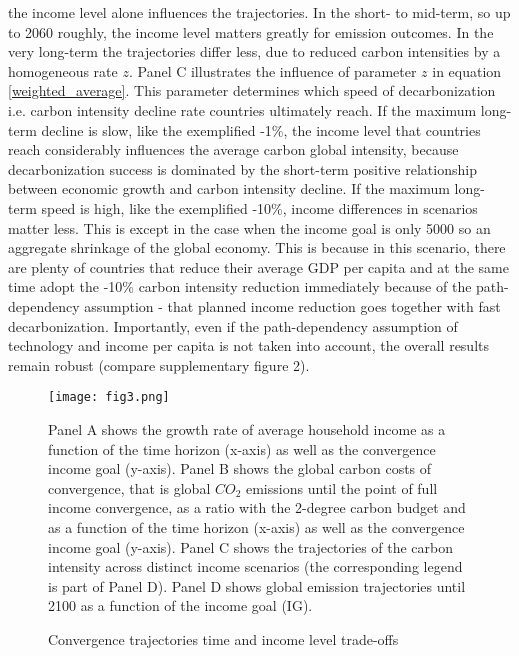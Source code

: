 \documentclass{article}
\begin{document}
the income level alone influences the trajectories. In the short- to mid-term, so up to 2060 roughly, the income level matters greatly for emission outcomes. In the very long-term the trajectories differ less, due to reduced carbon intensities by a homogeneous rate \(z\). %
Panel C illustrates the influence of parameter \(z\) in equation \ref{weighted_average}. This parameter determines which speed of decarbonization i.e. carbon intensity decline rate countries ultimately reach. If the maximum long-term decline is slow, like the exemplified -1\%, the income level that countries reach considerably influences the average carbon global intensity, because decarbonization success is dominated by the short-term positive relationship between economic growth and carbon intensity decline. If the maximum long-term speed is high, like the exemplified -10\%, income differences in scenarios matter less. This is except in the case when the income goal is only 5000 so an aggregate shrinkage of the global economy. This is because in this scenario, there are plenty of countries that reduce their average GDP per capita and at the same time adopt the -10\% carbon intensity reduction immediately because of the path-dependency assumption - that planned income reduction goes together with fast decarbonization. Importantly, even if the path-dependency assumption of technology and income per capita is not taken into account, the overall results remain robust (compare supplementary figure 2). 


\begin{figure}[hbt!]
\centering
 \texttt{[image: fig3.png]}
  \caption{Convergence trajectories time and income level trade-offs}
  \label{Figure 3: Carbon budget use until achieved convergence}
  \medskip
\small Panel A shows the growth rate of average household income as a function of the time horizon (x-axis) as well as the convergence income goal (y-axis). Panel B shows the global carbon costs of convergence, that is global \(CO_2\) emissions until the point of full income 
convergence, as a ratio with the 2-degree carbon budget and as a function of the time horizon (x-axis) as well as the convergence income goal (y-axis). Panel C shows the trajectories of the carbon intensity across distinct income scenarios (the corresponding legend is part of Panel D). Panel D shows global emission trajectories until 2100 as a function of the income goal (IG).
\end{figure}
\end{document}
